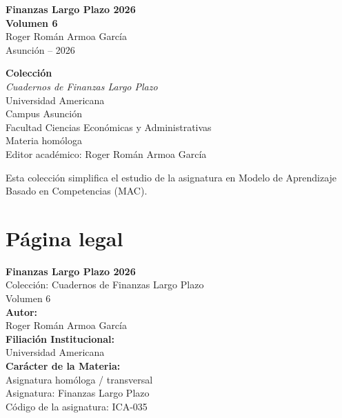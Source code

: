 \documentclass[12pt,a4paper]{article}
\begin{document}


\thispagestyle{empty}
\begin{center}
\Large\textbf{Finanzas Largo Plazo 2026}\\[0.3cm]
\large\textbf{Volumen 6}\\[0.3cm]
\large Roger Román Armoa García\\[0.2cm]
\normalsize Asunción -- 2026
\end{center}

\vfill

\begin{center}
\textbf{Colección}\\[0.15cm]
\textit{Cuadernos de Finanzas Largo Plazo}\\[0.3cm]
Universidad Americana\\
Campus Asunción\\
Facultad Ciencias Económicas y Administrativas\\
Materia homóloga\\[0.3cm]
Editor académico: Roger Román Armoa García
\end{center}

\vfill

\noindent
Esta colección simplifica el estudio de la asignatura en Modelo de Aprendizaje Basado en Competencias (MAC).\parencite{uaModeloCompetencias}

\newpage

\section*{Página legal}

\textbf{Finanzas Largo Plazo 2026}\\
Colección: Cuadernos de Finanzas Largo Plazo\\
Volumen 6\\[0.2cm]

\textbf{Autor:}\\
Roger Román Armoa García\\[0.2cm]

\textbf{Filiación Institucional:}\\
Universidad Americana\\[0.2cm]

\textbf{Carácter de la Materia:}\\
Asignatura homóloga / transversal\\[0.2cm]

Asignatura: Finanzas Largo Plazo\\
Código de la asignatura: ICA-035\\[0.2cm]
\end{document}
